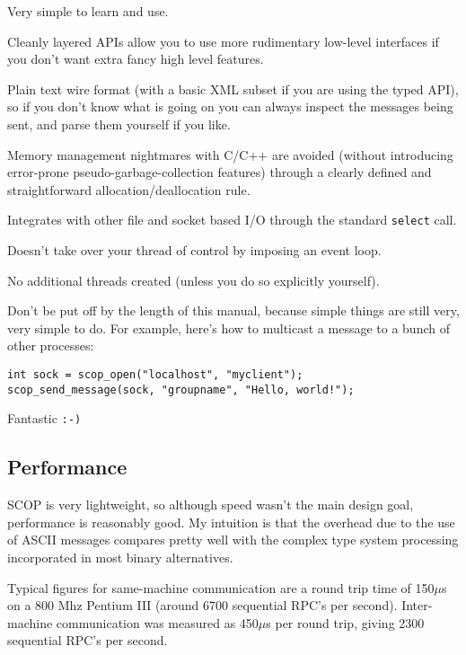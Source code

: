 \documentclass[12pt,a4paper,twoside]{article}
\renewcommand{\_}{\texttt{\symbol{95}}}
\begin{document}
\begin{bulletlist}
\item Very simple to learn and use.
\item Cleanly layered APIs allow you to use more rudimentary low-level
interfaces if you don't want extra fancy high level features.
\item Plain text wire format (with a basic XML subset if you are
using the typed API), so if you don't know what is going on you
can always inspect the messages being sent, and parse them yourself
if you like.
\item Memory management nightmares with C/C++ are avoided (without
introducing error-prone pseudo-garbage-collection features)
through a clearly defined and straightforward allocation/deallocation
rule.
\item Integrates with other file and socket based I/O through
the standard \texttt{select} call.
\item Doesn't take over your thread of control by imposing an
event loop.
\item No additional threads created (unless you do so explicitly
yourself).
\end{bulletlist}

Don't be put off by the length of this manual, because simple
things are still very, very simple to do. For example, here's how
to multicast a message to a bunch of other processes:

\begin{verbatim}
int sock = scop_open("localhost", "myclient");
scop_send_message(sock, "groupname", "Hello, world!");
\end{verbatim}

Fantastic \texttt{:-)}

\subsection{Performance}

SCOP is very lightweight, so although speed wasn't the main design
goal, performance is reasonably good. My intuition is that the overhead
due to the use of ASCII messages compares pretty well with the complex
type system processing incorporated in most binary alternatives.

Typical figures for same-machine communication are a round trip
time of 150$\mu$s on a 800 Mhz Pentium III (around 6700 sequential
RPC's per second). Inter-machine communication was measured as 450$\mu$s
per round trip, giving 2300 sequential RPC's per second.
\end{document}
